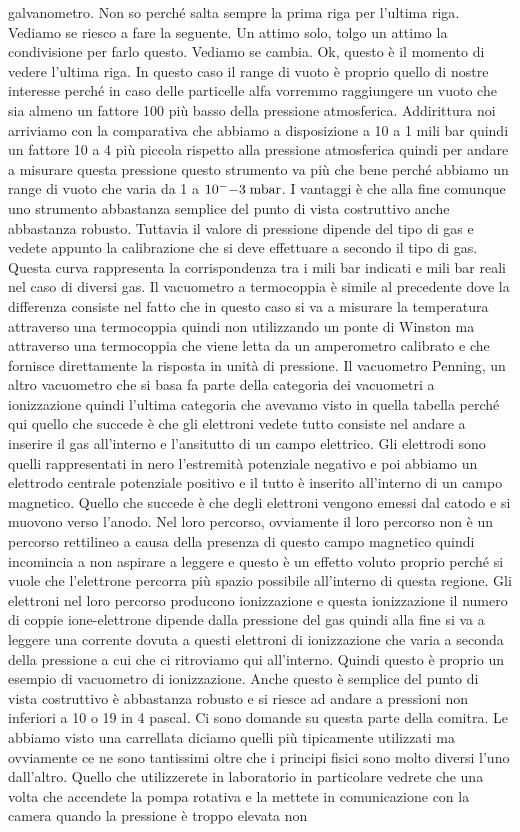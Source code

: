 galvanometro. Non so perché salta sempre la prima riga per l'ultima riga. Vediamo se riesco a fare la seguente. Un attimo solo, tolgo un attimo la condivisione per farlo questo. Vediamo se cambia. Ok, questo è il momento di vedere l'ultima riga. In questo caso il range di vuoto è proprio quello di nostre interesse perché in caso delle particelle alfa vorremmo raggiungere un vuoto che sia almeno un fattore 100 più basso della pressione atmosferica. Addirittura noi arriviamo con la comparativa che abbiamo a disposizione a 10 a 1 mili bar quindi un fattore 10 a 4 più piccola rispetto alla pressione atmosferica quindi per andare a misurare questa pressione questo strumento va più che bene perché abbiamo un range di vuoto che varia da 1 a $10^-{-3} \rm \; mbar$. I vantaggi è che alla fine comunque uno strumento abbastanza semplice del punto di vista costruttivo anche abbastanza robusto. Tuttavia il valore di pressione dipende del tipo di gas e vedete appunto la calibrazione che si deve effettuare a secondo il tipo di gas. Questa curva rappresenta la corrispondenza tra i mili bar indicati e mili bar reali nel caso di diversi gas. Il vacuometro a termocoppia è simile al precedente dove la differenza consiste nel fatto che in questo caso si va a misurare la temperatura attraverso una termocoppia quindi non utilizzando un ponte di Winston ma attraverso una termocoppia che viene letta da un amperometro calibrato e che fornisce direttamente la risposta in unità di pressione. Il vacuometro Penning, un altro vacuometro che si basa fa parte della categoria dei vacuometri a ionizzazione quindi l'ultima categoria che avevamo visto in quella tabella perché qui quello che succede è che gli elettroni vedete tutto consiste nel andare a inserire il gas all'interno e l'ansitutto di un campo elettrico. Gli elettrodi sono quelli rappresentati in nero l'estremità potenziale negativo e poi abbiamo un elettrodo centrale potenziale positivo e il tutto è inserito all'interno di un campo magnetico. Quello che succede è che degli elettroni vengono emessi dal catodo e si muovono verso l'anodo. Nel loro percorso, ovviamente il loro percorso non è un percorso rettilineo a causa della presenza di questo campo magnetico quindi incomincia a non aspirare a leggere e questo è un effetto voluto proprio perché si vuole che l'elettrone percorra più spazio possibile all'interno di questa regione. Gli elettroni nel loro percorso producono ionizzazione e questa ionizzazione il numero di coppie ione-elettrone dipende dalla pressione del gas quindi alla fine si va a leggere una corrente dovuta a questi elettroni di ionizzazione che varia a seconda della pressione a cui che ci ritroviamo qui all'interno. Quindi questo è proprio un esempio di vacuometro di ionizzazione. Anche questo è semplice del punto di vista costruttivo è abbastanza robusto e si riesce ad andare a pressioni non inferiori a 10 o 19 in 4 pascal. Ci sono domande su questa parte della comitra. Le abbiamo visto una carrellata diciamo quelli più tipicamente utilizzati ma ovviamente ce ne sono tantissimi oltre che i principi fisici sono molto diversi l'uno dall'altro. Quello che utilizzerete in laboratorio in particolare vedrete che una volta che accendete la pompa rotativa e la mettete in comunicazione con la camera quando la pressione è troppo elevata non 